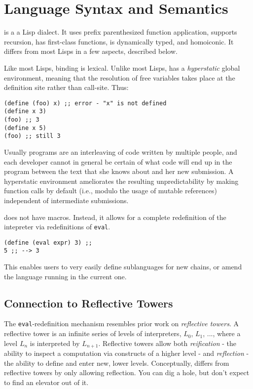\section{Language Syntax and Semantics}
\label{s:language}

\rad is a a Lisp dialect. It uses prefix parenthesized function application,
supports recursion, has first-class functions, is dynamically typed, and
homoiconic. It differs from most Lisps in a few aspects, described below.

Like most Lisps, binding is lexical. Unlike most Lisps, \rad has a
\textit{hyperstatic} global environment, meaning that the resolution of free
variables takes place at the definition site rather than call-site. Thus:

\begin{verbatim}
(define (foo) x) ;; error - "x" is not defined
(define x 3)
(foo) ;; 3
(define x 5)
(foo) ;; still 3
\end{verbatim}

Usually \rad programs are an interleaving of code written by multiple people,
and each developer cannot in general be certain of what code will end up in the
program between the text that she knows about and her new submission. A
hyperstatic environment ameliorates the resulting unpredictability by making
function calls by default (i.e., modulo the usage of mutable references)
independent of intermediate submissions.

\rad does not have macros. Instead, it allows for a complete redefinition of
the intepreter via redefinitions of \texttt{eval}.

\begin{verbatim}
(define (eval expr) 3) ;;
5 ;; --> 3
\end{verbatim}

This enables users to very easily define sublanguages for new chains, or amend
the language running in the current one.

\subsection{Connection to Reflective Towers} The \texttt{eval}-redefinition
mechanism resembles prior work on \textit{reflective towers}. A reflective
tower is an infinite series of levels of interpreters, $L_0$, $L_1$, ..., where
a level $L_n$ is interpreted by $L_{n+1}$. Reflective towers allow both
\textit{reification} - the ability to inspect a computation via constructs of a
higher level - and \textit{reflection} - the ability to define and enter new,
lower levels. Conceptually, \rad differs from reflective towers by only
allowing reflection. You can dig a hole, but don't expect to find an elevator
out of it.

